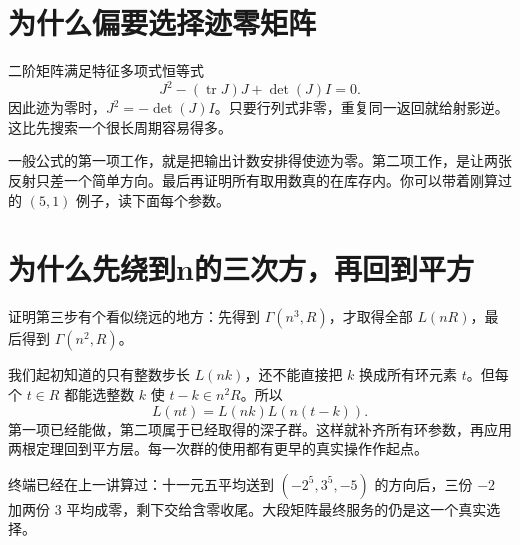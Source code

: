 \section{为什么偏要选择迹零矩阵}
二阶矩阵满足特征多项式恒等式
\[J^2-(\operatorname{tr}J)J+\det(J)I=0.
\]
因此迹为零时，$J^2=-\det(J)I$。只要行列式非零，重复同一返回就给射影逆。这比先搜索一个很长周期容易得多。

一般公式的第一项工作，就是把输出计数安排得使迹为零。第二项工作，是让两张反射只差一个简单方向。最后再证明所有取用数真的在库存内。你可以带着刚算过的 $(5,1)$ 例子，读下面每个参数。

\section{为什么先绕到n的三次方，再回到平方}
证明第三步有个看似绕远的地方：先得到 $\Gamma(n^3,R)$，才取得全部 $L(nR)$，最后得到 $\Gamma(n^2,R)$。

我们起初知道的只有整数步长 $L(nk)$，还不能直接把 $k$ 换成所有环元素 $t$。但每个 $t\in R$ 都能选整数 $k$ 使 $t-k\in n^2R$。所以
\[L(nt)=L(nk)L(n(t-k)).
\]
第一项已经能做，第二项属于已经取得的深子群。这样就补齐所有环参数，再应用两根定理回到平方层。每一次群的使用都有更早的真实操作作起点。

终端已经在上一讲算过：十一元五平均送到 $(-2^5,3^5,-5)$ 的方向后，三份 $-2$ 加两份 $3$ 平均成零，剩下交给含零收尾。大段矩阵最终服务的仍是这一个真实选择。
